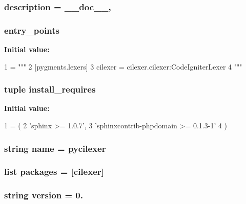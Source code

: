 \subsubsection[{description}]{\setlength{\rightskip}{0pt plus 5cm}description = \+\_\+\+\_\+doc\+\_\+\+\_\+,}\label{namespacesetup_a2661f439a4a94ffdcd5e47ae1da0bb1d}
\hypertarget{namespacesetup_a0afb2eb153236846e2dd516c55a0e0dd}{}
\subsubsection[{entry\+\_\+points}]{\setlength{\rightskip}{0pt plus 5cm}entry\+\_\+points}\label{namespacesetup_a0afb2eb153236846e2dd516c55a0e0dd}
{\bfseries Initial value\+:}
\begin{DoxyCode}
1 = \textcolor{stringliteral}{"""}
2 \textcolor{stringliteral}{[pygments.lexers]}
3 \textcolor{stringliteral}{cilexer = cilexer.cilexer:CodeIgniterLexer}
4 \textcolor{stringliteral}{"""}
\end{DoxyCode}
\hypertarget{namespacesetup_a0a66b558731b621d87cc2b72d0b9e1aa}{}
\subsubsection[{install\+\_\+requires}]{\setlength{\rightskip}{0pt plus 5cm}tuple install\+\_\+requires}\label{namespacesetup_a0a66b558731b621d87cc2b72d0b9e1aa}
{\bfseries Initial value\+:}
\begin{DoxyCode}
1 = (
2         \textcolor{stringliteral}{'sphinx >= 1.0.7'},
3         \textcolor{stringliteral}{'sphinxcontrib-phpdomain >= 0.1.3-1'}
4     )
\end{DoxyCode}
\hypertarget{namespacesetup_a8ccf841cb59e451791bcb2e1ac4f1edc}{}
\subsubsection[{name}]{\setlength{\rightskip}{0pt plus 5cm}string name = \textquotesingle{}pycilexer\textquotesingle{}}\label{namespacesetup_a8ccf841cb59e451791bcb2e1ac4f1edc}
\hypertarget{namespacesetup_af290766b923d1fc3f429da7bc5decf7a}{}
\subsubsection[{packages}]{\setlength{\rightskip}{0pt plus 5cm}list packages = \mbox{[}\textquotesingle{}cilexer\textquotesingle{}\mbox{]}}\label{namespacesetup_af290766b923d1fc3f429da7bc5decf7a}
\hypertarget{namespacesetup_af9c8593b58583463efe6932e24c9d6e6}{}
\subsubsection[{version}]{\setlength{\rightskip}{0pt plus 5cm}string version = \textquotesingle{}0.\textquotesingle{}}\label{namespacesetup_af9c8593b58583463efe6932e24c9d6e6}
